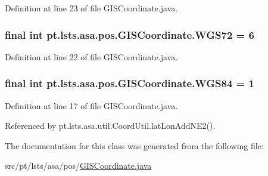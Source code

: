 Definition at line 23 of file G\+I\+S\+Coordinate.\+java.

\hypertarget{classpt_1_1lsts_1_1asa_1_1pos_1_1GISCoordinate_af024d2e389e77f4e7bd6ae073c08cf45}{}
\subsubsection[{W\+G\+S72}]{\setlength{\rightskip}{0pt plus 5cm}final int pt.\+lsts.\+asa.\+pos.\+G\+I\+S\+Coordinate.\+W\+G\+S72 = 6\hspace{0.3cm}{\ttfamily [static]}}\label{classpt_1_1lsts_1_1asa_1_1pos_1_1GISCoordinate_af024d2e389e77f4e7bd6ae073c08cf45}


Definition at line 22 of file G\+I\+S\+Coordinate.\+java.

\hypertarget{classpt_1_1lsts_1_1asa_1_1pos_1_1GISCoordinate_aa8ffa67276523ca258e07ef16e01dc2b}{}
\subsubsection[{W\+G\+S84}]{\setlength{\rightskip}{0pt plus 5cm}final int pt.\+lsts.\+asa.\+pos.\+G\+I\+S\+Coordinate.\+W\+G\+S84 = 1\hspace{0.3cm}{\ttfamily [static]}}\label{classpt_1_1lsts_1_1asa_1_1pos_1_1GISCoordinate_aa8ffa67276523ca258e07ef16e01dc2b}


Definition at line 17 of file G\+I\+S\+Coordinate.\+java.



Referenced by pt.\+lsts.\+asa.\+util.\+Coord\+Util.\+lat\+Lon\+Add\+N\+E2().



The documentation for this class was generated from the following file\+:\begin{DoxyCompactItemize}
\item 
src/pt/lsts/asa/pos/\hyperlink{GISCoordinate_8java}{G\+I\+S\+Coordinate.\+java}\end{DoxyCompactItemize}
